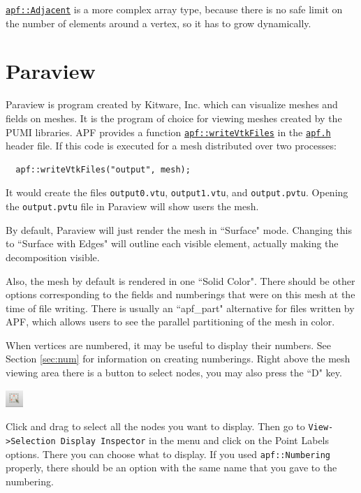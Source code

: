 \documentclass{article}
\begin{document}
\href{http://scorec.rpi.edu/~dibanez/core/namespaceapf.html#a12d882b4789bf98322cbe6f02c91b1f8}{\texttt{apf::Adjacent}} is a more complex array type,
because there is no safe limit on the number of elements around
a vertex, so it has to grow dynamically.

\appendix

\section{Paraview}
\label{sec:paraview}

Paraview is program created by Kitware, Inc. which can visualize meshes
and fields on meshes.
It is the program of choice for viewing meshes created by the PUMI libraries.
APF provides a function
\href{http://scorec.rpi.edu/~dibanez/core/namespaceapf.html#a060af76b0bb25bffe37dc7a20e121936}{\texttt{apf::writeVtkFiles}}
in the
\href{https://github.com/SCOREC/core/blob/master/apf/apf.h}{\texttt{apf.h}}
header file.
If this code is executed for a mesh distributed over two processes:

\begin{lstlisting}
  apf::writeVtkFiles("output", mesh);
\end{lstlisting}

It would create the files \texttt{output0.vtu}, \texttt{output1.vtu},
and \texttt{output.pvtu}.
Opening the \texttt{output.pvtu} file in Paraview will show users the
mesh.

By default, Paraview will just render the mesh in ``Surface" mode.
Changing this to ``Surface with Edges" will outline each visible element,
actually making the decomposition visible.

Also, the mesh by default is rendered in one ``Solid Color".
There should be other options corresponding to the fields and numberings
that were on this mesh at the time of file writing.
There is usually an ``apf\_part" alternative for files written by APF, which
allows users to see the parallel partitioning of the mesh in color.

When vertices are numbered, it may be useful to display their numbers.
See Section \ref{sec:num} for information on creating numberings.
Right above the mesh viewing area there is a button to select nodes,
you may also press the ``D" key.

\begin{center}
\includegraphics[width=0.05\textwidth]{select_nodes.png}
\end{center}

Click and drag to select all the nodes you want to display.
Then go to \texttt{View->Selection Display Inspector} in the menu and click on
the Point Labels options.
There you can choose what to display.
If you used \texttt{apf::Numbering} properly, there should be an option
with the same name that you gave to the numbering.
\end{document}
